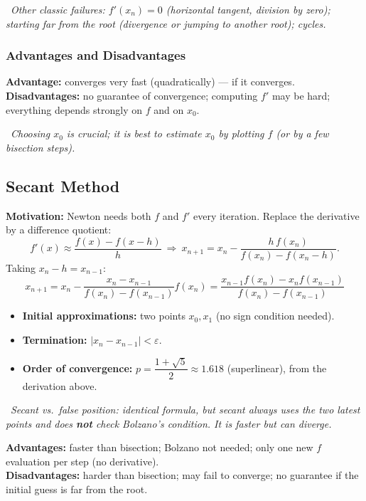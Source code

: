 \documentclass[hidelinks]{article}
\newcommand{\callout}[1]{\par\smallskip\noindent{\color{capri}$\blacktriangleright$}\ \textit{#1}\par\smallskip}
\newcommand{\abs}[1]{\left|#1\right|}
\begin{document}
\callout{Other classic failures: $f'(x_n)=0$ (horizontal tangent, division by zero); starting far from the root (divergence or jumping to another root); cycles.}

\subsubsection{Advantages and Disadvantages}

\textbf{Advantage:} converges very fast (quadratically) --- if it converges.\\
\textbf{Disadvantages:} no guarantee of convergence; computing $f'$ may be hard; everything depends strongly on $f$ and on $x_0$.

\callout{Choosing $x_0$ is crucial; it is best to estimate $x_0$ by plotting $f$ (or by a few bisection steps).}

\subsection{Secant Method}

\textbf{Motivation:} Newton needs both $f$ and $f'$ every iteration. Replace the derivative by a difference quotient:
\[
f'(x)\approx\frac{f(x)-f(x-h)}{h}
\ \Longrightarrow\
x_{n+1}=x_n-\frac{h\,f(x_n)}{f(x_n)-f(x_n-h)} .
\]
Taking $x_n-h=x_{n-1}$:
\[
\boxed{\,x_{n+1}=x_n-\frac{x_n-x_{n-1}}{f(x_n)-f(x_{n-1})}f(x_n)=\frac{x_{n-1}f(x_n)-x_nf(x_{n-1})}{f(x_n)-f(x_{n-1})}\,}
\]
\begin{itemize}
    \item \textbf{Initial approximations:} two points $x_0,x_1$ (no sign condition needed).
    \item \textbf{Termination:} $\abs{x_n-x_{n-1}}<\varepsilon$.
    \item \textbf{Order of convergence:} $p=\dfrac{1+\sqrt5}{2}\approx1.618$ (superlinear), from the derivation above.
\end{itemize}

\callout{Secant vs.\ false position: identical formula, but secant always uses the \emph{two latest} points and does \textbf{not} check Bolzano's condition. It is faster but can diverge.}

\textbf{Advantages:} faster than bisection; Bolzano not needed; only one new $f$ evaluation per step (no derivative).\\
\textbf{Disadvantages:} harder than bisection; may fail to converge; no guarantee if the initial guess is far from the root.
\end{document}
